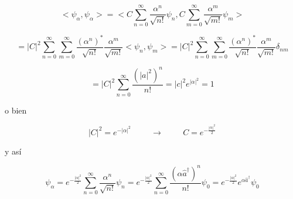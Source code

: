 \documentclass[12pt,a4paper]{article}
\begin{document}
\begin{enumerate}
\begin{equation*}
    <\psi_{\alpha}, \psi_{\alpha}> = <C\sum_{n=0}^{\infty} \frac{\alpha^n}{\sqrt{n!} }\psi_{n},C\sum_{m=0}^{\infty} \frac{\alpha^m}{\sqrt{m!} }\psi_{m}>
\end{equation*}

\begin{equation*}
    = |C|^2 \sum_{n=0}^{\infty} \sum_{m=0}^{\infty} \frac{(\alpha^{n})^{*}}{\sqrt{n!}} \frac{\alpha^{m}}{\sqrt{m!}} <\psi_{n}, \psi_{m}> = |C|^2 \sum_{n=0}^{\infty} \sum_{m=0}^{\infty}\frac{(\alpha^{n})^{*}}{\sqrt{n!}} \frac{\alpha^{m}}{\sqrt{m!}} \delta_{nm}
\end{equation*}

\begin{equation*}
    = |C|^2 \sum_{n=0}^{\infty} \frac{(|a|^2)^{n}}{n!} = |c|^2 e^{|\alpha|^2} = 1
\end{equation*}

o bien

\begin{equation*}
    |C|^2 = e^{- |\alpha|^2} \hspace{1cm} \rightarrow \hspace{1cm}  C= e^{- \frac{|\alpha|^2}{2}}
\end{equation*}

y así

\begin{equation*}
    \psi_{\alpha} = e^{-\frac{|\alpha|^2}{2}} \sum_{n=0}^{\infty} \frac{\alpha^n}{\sqrt{n!}} \psi_n = e^{-\frac{|\alpha|^2}{2}} \sum_{n=0}^{\infty} \frac{(\alpha\hat{a}^{\dagger})^n}{n!} \psi_0 = e^{-\frac{|\alpha|^2}{2}} e^{\alpha \hat{a}^{\dagger}} \psi_0
\end{equation*}
    
    
\end{enumerate}
\end{document}
